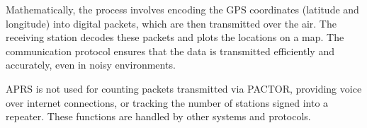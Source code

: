 Mathematically, the process involves encoding the GPS coordinates (latitude and longitude) into digital packets, which are then transmitted over the air. The receiving station decodes these packets and plots the locations on a map. The communication protocol ensures that the data is transmitted efficiently and accurately, even in noisy environments.

APRS is not used for counting packets transmitted via PACTOR, providing voice over internet connections, or tracking the number of stations signed into a repeater. These functions are handled by other systems and protocols.

